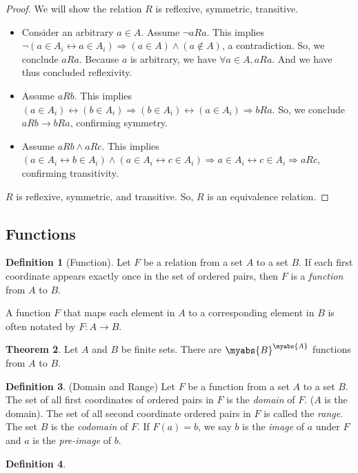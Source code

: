\documentclass[11pt]{article}
\theoremstyle{definition}
\newtheorem{theorem}{Theorem}[section]
\newtheorem{definition}[theorem]{Definition}
\begin{document}
\begin{proof}
We will show the relation $R$ is reflexive, symmetric, transitive.
\begin{itemize}
    \item Consider an arbitrary $a \in A$. Assume $\lnot aRa$. This implies $\lnot(a \in A_i \leftrightarrow a \in A_i) \Rightarrow (a \in A) \land (a \notin A)$, a contradiction. So, we conclude $aRa$. Because $a$ is arbitrary, we have $\forall a \in A, aRa$. And we have thus concluded reflexivity.
    \item Assume $aRb$. This implies $(a \in A_i) \leftrightarrow (b \in
        A_i) \Rightarrow (b \in A_i) \leftrightarrow (a \in A_i)
        \Rightarrow bRa$. So, we conclude $aRb \rightarrow bRa$, confirming
        symmetry.
    \item Assume $aRb \land aRc$. This implies $(a \in A_i \leftrightarrow b \in A_i) \land (a \in A_i \leftrightarrow c \in A_i) \Rightarrow a \in A_i \leftrightarrow c \in A_i \Rightarrow aRc$, confirming transitivity.
\end{itemize}
$R$ is reflexive, symmetric, and transitive. So, $R$ is an equivalence relation.
\end{proof}
\subsection{Functions}
\begin{definition}[Function]
Let $F$ be a relation from a set $A$ to a set $B$. If each first coordinate appears exactly once in the set of ordered pairs, then $F$ is a \emph{function} from $A$ to $B$.
\end{definition}
A function $F$ that maps each element in $A$ to a corresponding element in
$B$ is often notated by $F: A \rightarrow B$.
\begin{theorem}
    Let $A$ and $B$ be finite sets. There are $\myabs{B}^{\myabs{A}}$
    functions from $A$ to $B$.
\end{theorem}
\begin{definition}(Domain and Range)
    Let $F$ be a function from a set $A$ to a set $B$. The set of all first
    coordinates of ordered pairs in $F$ is the \emph{domain} of $F$. ($A$
    is the domain). The set of all second coordinate ordered pairs in $F$
    is called the \emph{range}. The set $B$ is the \emph{codomain} of $F$.
    If $F(a) = b$, we say $b$ is the \emph{image} of $a$ under $F$ and $a$
    is the \emph{pre-image} of $b$.
\end{definition}
\begin{definition}

\end{definition}
\end{document}
